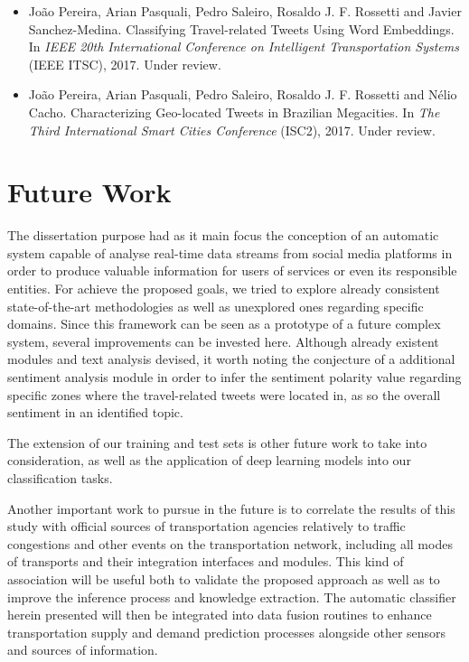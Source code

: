 \begin{itemize}
\begin{itemize}
\begin{itemize}
\begin{itemize}
	\item
	João Pereira, Arian Pasquali, Pedro Saleiro, Rosaldo J. F. Rossetti and Javier Sanchez-Medina. {\color{blue}Classifying Travel-related Tweets Using Word Embeddings}. In \emph{IEEE 20th International Conference on Intelligent Transportation Systems} (IEEE ITSC), 2017. Under review.
	
	\item
	João Pereira, Arian Pasquali, Pedro Saleiro, Rosaldo J. F. Rossetti and Nélio Cacho. {\color{blue}Characterizing Geo-located Tweets in Brazilian Megacities}. In \emph{The Third International Smart Cities Conference} (ISC2), 2017. Under review.
\end{itemize}

\section{Future Work}

The dissertation purpose had as it main focus the conception of an automatic system capable of analyse real-time data streams from social media platforms in order to produce valuable information for users of services or even its responsible entities. For achieve the proposed goals, we tried to explore already consistent state-of-the-art methodologies as well as unexplored ones regarding specific domains. Since this framework can be seen as a prototype of a future complex system, several improvements can be invested here. Although already existent modules and text analysis devised, it worth noting the conjecture of a additional sentiment analysis module in order to infer the sentiment polarity value regarding specific zones where the travel-related tweets were located in, as so the overall sentiment in an identified topic.

The extension of our training and test sets is other future work to take into consideration, as well as the application of deep learning models into our classification tasks.

Another important work to pursue in the future is to correlate the results of this study with official sources of transportation agencies relatively to traffic congestions and other events on the transportation network, including all modes of transports and their integration interfaces and modules. This kind of association will be useful both to validate the proposed approach as well as to improve the inference process and knowledge extraction. The automatic classifier herein presented will then be integrated into data fusion routines to enhance transportation supply and demand prediction processes alongside other sensors and sources of information.


\end{itemize}
\end{itemize}
\end{itemize}
